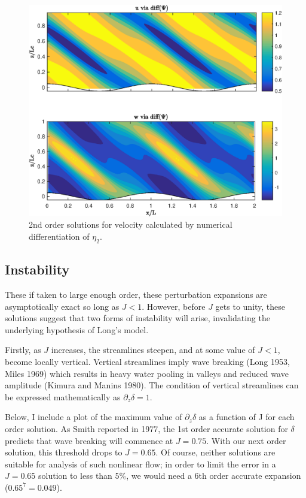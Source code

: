 \documentclass[12pt]{article}
\begin{document}
\begin{figure}
	\centering
	\includegraphics[width=1\textwidth]{vel_via_diff.eps}
	\caption{2nd order solutions for velocity calculated by numerical differentiation of $\eta_2$.}
\end{figure}

\subsection{Instability}

These if taken to large enough order, these perturbation expansions are asymptotically exact so long as $J<1$. However, before $J$ gets to unity, these solutions suggest that two forms of instability will arise, invalidating the underlying hypothesis of Long's model. 

Firstly, as $J$ increases, the streamlines steepen, and at some value of $J<1$, become locally vertical. Vertical streamlines imply wave breaking (Long 1953, Miles 1969) which results in heavy water pooling in valleys and reduced wave amplitude (Kimura and Manins 1980). The condition of vertical streamlines can be expressed mathematically as $\partial_z \delta = 1$. 

Below, I include a plot of the maximum value of $\partial_z \delta$ as a function of J for each order solution. As Smith reported in 1977, the 1st order accurate solution for $\delta$ predicts that wave breaking will commence at $J=0.75$. With our next order solution, this threshold drops to $J=0.65$. Of course, neither solutions are suitable for analysis of such nonlinear flow; in order to limit the error in a $J=0.65$ solution to less than $5\%$, we would need a 6th order accurate expansion ($0.65^7 = 0.049$). 
\end{document}
